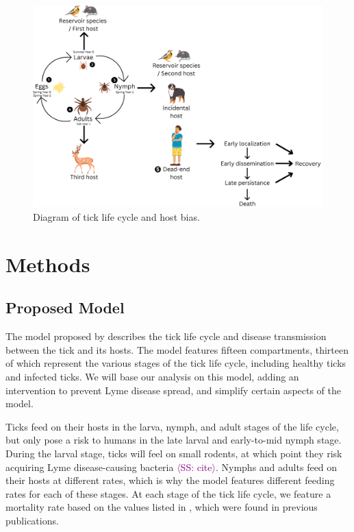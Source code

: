 \documentclass[12pt, centerh1]{article}
\newcommand{\sophie}[1]{{\textcolor{purple}{$\langle$SS: #1$\rangle$}}}
\begin{document}
\begin{figure}[h]
    \centering
    \includegraphics[scale = 0.15]{figures/Tick life cycle and progression of lyme disease.png}
    \caption{Diagram of tick life cycle and host bias.}
    \label{fig:lifecycle}
\end{figure}

\section{Methods}

\subsection{Proposed Model}
The model proposed by \citet{lou2014impact} describes the tick life cycle and disease transmission between the tick and its hosts. The model features fifteen compartments, thirteen of which represent the various stages of the tick life cycle, including healthy ticks and infected ticks. We will base our analysis on this model, adding an intervention to prevent Lyme disease spread, and simplify certain aspects of the model. 

Ticks feed on their hosts in the larva, nymph, and adult stages of the life cycle, but only pose a risk to humans in the late larval and early-to-mid nymph stage. During the larval stage, ticks will feel on small rodents, at which point they risk acquiring Lyme disease-causing bacteria \sophie{cite}. Nymphs and adults feed on their hosts at different rates, which is why the model features different feeding rates for each of these stages.
At each stage of the tick life cycle, we feature a mortality rate based on the values listed in \citet{lou2014impact}, which were found in previous publications. 
\end{document}
